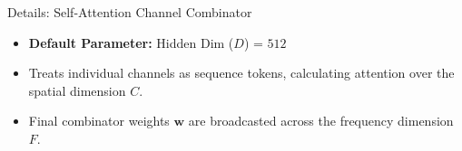 \documentclass[8pt,hyperref={pdfpagelabels=true},xcolor=table,aspectratio=169]{beamer}
\begin{document}
\begin{frame}{Details: Self-Attention Channel Combinator}
\begin{center}
    \end{center}
    
    \vspace{1.0em}
    \begin{itemize}
        \item \textbf{Default Parameter:} Hidden Dim ($D$) = $512$
        \item Treats individual channels as sequence tokens, calculating attention over the spatial dimension $C$.
        \item Final combinator weights $\mathbf{w}$ are broadcasted across the frequency dimension $F$.
    \end{itemize}
\end{frame}
\end{document}
